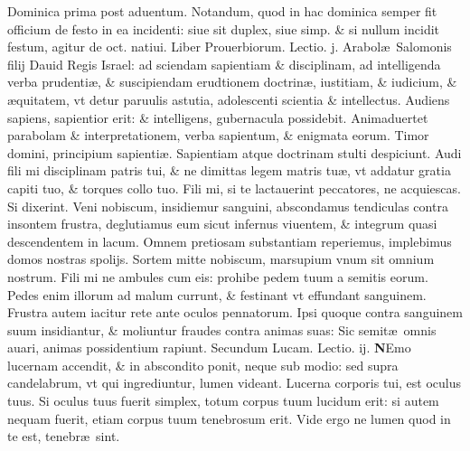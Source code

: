 \documentclass[a5paper,10pt]{book}
\def\leftmarginnote{%
	\lrmarginnote{\hskip -\marginparsep \hskip -6.5em}}
\def\rightmarginnote{%
	\lrmarginnote{\hskip\columnwidth \hskip -1em}}
\def\ae{æ}
\begin{document}
\begin{multicols*}{2}
\newline {} \color{red} \hypertarget{SUN-PRIMA-POST-ADV}{Dominica prima post aduentum.}\color{black}
\newline \color{red} Notandum, quod in hac dominica semper fit officium de festo in ea incidenti: siue sit duplex, siue simp. \& si nullum incidit festum, agitur de oct. natiui. \color{black}
\newline {} \color{red} Liber Prouerbiorum. \hfill Lectio. j. \color{black}
\vspace{-1.25em}
Arabol\ae \ Salomonis\leftmarginnote{\begin{flushright}ca 1.\end{flushright}} filij Dauid Regis Israel: ad sciendam sapientiam \& disciplinam, ad intelligenda verba prudenti\ae , \& suscipiendam erudtionem doctrin\ae , iustitiam, \& iudicium, \& \ae quitatem, vt detur paruulis astutia, adolescenti scientia \& intellectus.
Audiens sapiens, sapientior erit: \& intelligens, gubernacula possidebit.
Animaduertet parabolam \& interpretationem, verba sapientum, \& enigmata eorum. Timor domini, principium sapienti\ae . Sapientiam atque doctrinam stulti despiciunt.
Audi fili mi disciplinam patris tui, \& ne dimittas legem matris tu\ae , vt addatur gratia capiti tuo, \& torques collo tuo.
Fili mi, si te lactauerint peccatores, ne acquiescas.
Si dixerint. Veni nobiscum, insidiemur sanguini, abscondamus tendiculas contra insontem frustra, deglutiamus eum sicut infernus viuentem, \& integrum quasi descendentem in lacum.
Omnem pretiosam substantiam reperiemus, implebimus domos nostras spolijs.
Sortem mitte nobiscum, marsupium vnum sit omnium nostrum. Fili mi ne ambules cum eis: prohibe pedem tuum a semitis eorum.
Pedes enim illorum ad malum currunt, \& festinant vt effundant sanguinem.
Frustra autem iacitur rete ante oculos pennatorum.
Ipsi quoque contra sanguinem suum insidiantur,
\& moliuntur fraudes contra animas suas: Sic semit\ae \ omnis auari, animas possidentium rapiunt.
\newline \color{red} Secundum Lucam. \hfill Lectio. ij. \color{black}
\vspace{-1.25em}
\lettrine[lines=2]{\bfseries \color{red} N}{}Emo\rightmarginnote{c. 11.} lucernam accendit, \& in abscondito ponit, neque sub modio: sed supra candelabrum, vt qui ingrediuntur, lumen videant.
Lucerna corporis tui, est oculus tuus. Si oculus tuus fuerit simplex, totum corpus tuum lucidum erit: si autem nequam fuerit, etiam corpus tuum tenebrosum erit. Vide ergo ne lumen quod in te est, tenebr\ae \ sint.

\end{multicols*}
\end{document}

